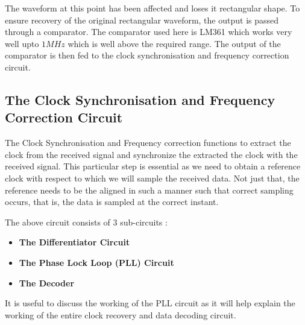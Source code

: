 \documentclass{article}
\begin{document}
The waveform at this point has been affected and loses it rectangular shape. To ensure recovery of the original rectangular waveform, the output is passed through a comparator. The comparator used here is LM361 which works very well upto $1 MHz$ which is well above the required range. The output of the comparator is then fed to the clock synchronisation and frequency correction circuit.


\subsection{The Clock Synchronisation and Frequency Correction Circuit}
The Clock Synchronisation and Frequency correction functions to extract the clock from the received signal and synchronize the extracted the clock with the received signal. This particular step is essential as we need to obtain a reference clock with respect to which  we will sample the received data. Not just that, the reference needs to be the aligned in such a manner such that correct sampling occurs, that is, the data is sampled at the correct instant.

The above circuit consists of 3 sub-circuits :
\begin{itemize}
\item \textbf{The Differentiator Circuit}
\item \textbf{The Phase Lock Loop (PLL) Circuit}
\item \textbf{The Decoder}
\end{itemize}
It is useful to discuss the working of the PLL circuit as it will help explain the working of the entire clock recovery and data decoding circuit.
\end{document}
